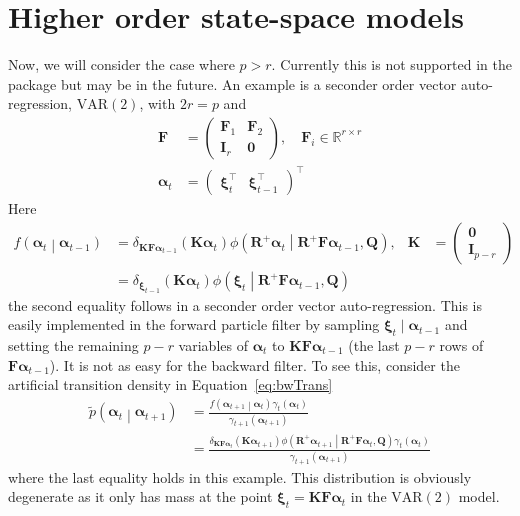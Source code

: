 \documentclass[notitlepage]{article}
\renewcommand{\vec}[1]{\bm{#1}}
\newcommand{\mat}[1]{\mathbf{#1}}
\newcommand{\Lparen}[1]{\left( #1\right)}
\newcommand{\Cond}[2]{ #1 \middle\vert  #2}
\newcommand{\optor}[2]{#1\Lparen{#2}}
\newcommand{\optorC}[3]{\optor{#1}{\Cond{#2}{#3}}}
\newcommand{\pdenstC}[2]{\optorC{\widetilde p}{#1}{#2}}
\newcommand{\normaldC}[3]{\optorC{\phi}{#1}{#2,#3}}
\newcommand\dirac[2]{\optor{\delta_{#1}}{#2}}
\newcommand{\dimState}{p}
\newcommand{\dimRng}{r}
\newcommand\MVAR[1]{\optor{\text{VAR}}{#1}}
\begin{document}
\section{Higher order state-space models}
Now, we will consider the case where $\dimState > \dimRng$. 
Currently this is not supported in the package but may be in the future. 
An example is a seconder 
order vector auto-regression, $\MVAR{2}$, with $2\dimRng = \dimState$ and %
%
\begin{align*}
\mat F &= \begin{pmatrix}
		\mat F_1 & \mat F_2 \\
		\mat I_\dimRng & \mat 0
	\end{pmatrix}, \quad \mat F_i \in \mathbb{R}^{\dimRng\times\dimRng} \\
\vec\alpha_t &= \begin{pmatrix}
	\vec\xi_t^\top & \vec\xi_{t-1}^\top
\end{pmatrix}^\top
\end{align*}%
%
Here %
%
\begin{align*}
\optorC{f}{\vec\alpha_t}{\vec\alpha_{t - 1}} &= 
	\dirac{\mat K\mat F\vec\alpha_{t-1}}{\mat K\vec\alpha_t}
	\normaldC{\mat R^+\vec\alpha_t}{
		\mat R^+\mat F\vec\alpha_{t-1}}{\mat Q}, 
	& \mat K &=
		\begin{pmatrix} \mat 0 \\ \mat I_{\dimState - \dimRng} \end{pmatrix}  \\
&= \dirac{\vec \xi_{t-1}}{\mat K\vec\alpha_t}
	\normaldC{\vec\xi_t}{\mat R^+\mat F\vec\alpha_{t-1}}{\mat Q}
\end{align*}%
%
the second equality follows in a seconder order vector auto-regression. 
This is easily implemented in the forward 
particle filter by sampling $\vec\xi_t \mid \vec\alpha_{t-1}$ and setting the remaining
$\dimState - \dimRng$ variables of $\vec\alpha_t$ to 
$\mat K\mat F\vec\alpha_{t-1}$ (the last $\dimState - \dimRng$ rows of 
$\mat F\vec\alpha_{t-1}$). It is not as easy for the backward filter. To see this, consider the artificial transition density in Equation~\eqref{eq:bwTrans}%
%
\begin{align*}
\pdenstC{\vec{\alpha}_t}{\vec{\alpha}_{t+1}} &= 
	\frac{
		\optorC{f}{\vec\alpha_{t+1}}{\vec\alpha_t}
		\gamma_t(\vec\alpha_t)
	}{\gamma_{t+1}(\vec\alpha_{t + 1})} \\
& = \frac{
		\dirac{\mat K\mat F\vec\alpha_t}{\mat K\vec\alpha_{t + 1}}
		\normaldC{\mat R^+\vec\alpha_{t +1}}{
			\mat R^+\mat F\vec\alpha_t}{\mat Q}
		\gamma_t(\vec\alpha_t)
	}{\gamma_{t+1}(\vec\alpha_{t + 1})}
\end{align*}%
%
where the last equality holds in this example. This distribution is obviously degenerate 
as it only has mass at the point $\vec\xi_t = \mat K\mat F\vec\alpha_t$ in the 
$\text{VAR}(2)$ model. 
\end{document}
